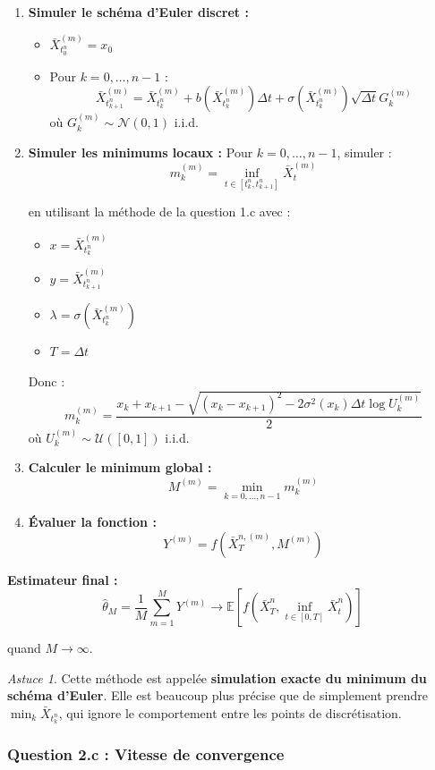 \documentclass[12pt,a4paper]{article}
\theoremstyle{definition}
\theoremstyle{remark}
\newtheorem*{astuce}{Astuce}
\newcommand{\E}{\mathbb{E}}
\begin{document}
\begin{enumerate}
\item \textbf{Simuler le schéma d'Euler discret :}
\begin{itemize}
\item $\bar{X}_{t_0^n}^{(m)} = x_0$
\item Pour $k = 0, \ldots, n-1$ :
\[
\bar{X}_{t_{k+1}^n}^{(m)} = \bar{X}_{t_k^n}^{(m)} + b(\bar{X}_{t_k^n}^{(m)})\Delta t + \sigma(\bar{X}_{t_k^n}^{(m)})\sqrt{\Delta t} G_k^{(m)}
\]
où $G_k^{(m)} \sim \mathcal{N}(0,1)$ i.i.d.
\end{itemize}

\item \textbf{Simuler les minimums locaux :}
Pour $k = 0, \ldots, n-1$, simuler :
\[
m_k^{(m)} = \inf_{t \in [t_k^n, t_{k+1}^n]} \bar{X}_t^{(m)}
\]

en utilisant la méthode de la question 1.c avec :
\begin{itemize}
\item $x = \bar{X}_{t_k^n}^{(m)}$
\item $y = \bar{X}_{t_{k+1}^n}^{(m)}$
\item $\lambda = \sigma(\bar{X}_{t_k^n}^{(m)})$
\item $T = \Delta t$
\end{itemize}

Donc :
\[
m_k^{(m)} = \frac{x_k + x_{k+1} - \sqrt{(x_k - x_{k+1})^2 - 2\sigma^2(x_k)\Delta t\log U_k^{(m)}}}{2}
\]
où $U_k^{(m)} \sim \mathcal{U}([0,1])$ i.i.d.

\item \textbf{Calculer le minimum global :}
\[
M^{(m)} = \min_{k=0,\ldots,n-1} m_k^{(m)}
\]

\item \textbf{Évaluer la fonction :}
\[
Y^{(m)} = f(\bar{X}_T^{n,(m)}, M^{(m)})
\]
\end{enumerate}

\textbf{Estimateur final :}
\[
\hat{\theta}_M = \frac{1}{M}\sum_{m=1}^M Y^{(m)} \to \E[f(\bar{X}_T^n, \inf_{t \in [0,T]} \bar{X}_t^n)]
\]

quand $M \to \infty$.

\begin{astuce}
Cette méthode est appelée \textbf{simulation exacte du minimum du schéma d'Euler}. Elle est beaucoup plus précise que de simplement prendre $\min_{k} \bar{X}_{t_k^n}$, qui ignore le comportement entre les points de discrétisation.
\end{astuce}

\subsubsection{Question 2.c : Vitesse de convergence}
\end{document}
